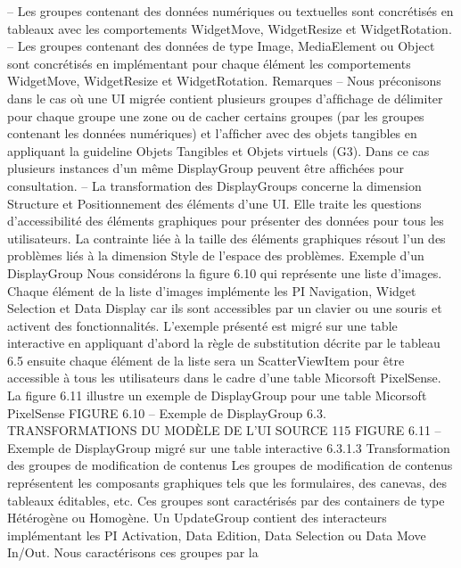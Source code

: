 \documentclass{article}
\begin{document}
– Les groupes contenant des donn\'{e}es num\'{e}riques ou textuelles sont concr\'{e}tis\'{e}s en tableaux avec
les comportements WidgetMove, WidgetResize et WidgetRotation.
– Les groupes contenant des donn\'{e}es de type Image, MediaElement ou Object sont concr\'{e}tis\'{e}s
en impl\'{e}mentant pour chaque \'{e}l\'{e}ment les comportements WidgetMove, WidgetResize et WidgetRotation.
Remarques
– Nous pr\'{e}conisons dans le cas o\`{u} une UI migr\'{e}e contient plusieurs groupes d’afﬁchage de d\'{e}limiter pour chaque groupe une zone ou de cacher certains groupes (par les groupes contenant les
donn\'{e}es num\'{e}riques) et l’afﬁcher avec des objets tangibles en appliquant la guideline Objets
Tangibles et Objets virtuels (G3). Dans ce cas plusieurs instances d’un m\^{e}me DisplayGroup
peuvent \^{e}tre afﬁch\'{e}es pour consultation.
– La transformation des DisplayGroups concerne la dimension Structure et Positionnement des
\'{e}l\'{e}ments d’une UI. Elle traite les questions d’accessibilit\'{e} des \'{e}l\'{e}ments graphiques pour pr\'{e}senter des donn\'{e}es pour tous les utilisateurs. La contrainte li\'{e}e \`{a} la taille des \'{e}l\'{e}ments graphiques
r\'{e}sout l’un des probl\`{e}mes li\'{e}s \`{a} la dimension Style de l’espace des probl\`{e}mes.
Exemple d’un DisplayGroup
Nous consid\'{e}rons la ﬁgure 6.10 qui repr\'{e}sente une liste d’images.
Chaque \'{e}l\'{e}ment de la liste d’images impl\'{e}mente les PI Navigation, Widget Selection et Data Display
car ils sont accessibles par un clavier ou une souris et activent des fonctionnalit\'{e}s.
L’exemple pr\'{e}sent\'{e} est migr\'{e} sur une table interactive en appliquant d’abord la r\`{e}gle de substitution d\'{e}crite par le tableau 6.5 ensuite chaque \'{e}l\'{e}ment de la liste sera un ScatterViewItem pour \^{e}tre
accessible \`{a} tous les utilisateurs dans le cadre d’une table Micorsoft PixelSense. La ﬁgure 6.11 illustre
un exemple de DisplayGroup pour une table Micorsoft PixelSense
FIGURE 6.10 – Exemple de DisplayGroup
6.3. TRANSFORMATIONS DU MODÈLE DE L’UI SOURCE
115
FIGURE 6.11 – Exemple de DisplayGroup migr\'{e} sur une table interactive
6.3.1.3
Transformation des groupes de modiﬁcation de contenus
Les groupes de modiﬁcation de contenus repr\'{e}sentent les composants graphiques tels que les
formulaires, des canevas, des tableaux \'{e}ditables, etc. Ces groupes sont caract\'{e}ris\'{e}s par des containers
de type H\'{e}t\'{e}rog\`{e}ne ou Homog\`{e}ne. Un UpdateGroup contient des interacteurs impl\'{e}mentant les PI
Activation, Data Edition, Data Selection ou Data Move In/Out. Nous caract\'{e}risons ces groupes par la
\end{document}
